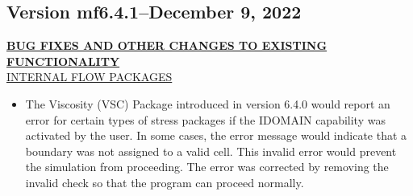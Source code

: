 	\subsection{Version mf6.4.1--December 9, 2022}
	
	\textbf{\underline{BUG FIXES AND OTHER CHANGES TO EXISTING FUNCTIONALITY}} \\

	\underline{INTERNAL FLOW PACKAGES}
	\begin{itemize}
		\item The Viscosity (VSC) Package introduced in version 6.4.0 would report an error for certain types of stress packages if the IDOMAIN capability was activated by the user.  In some cases, the error message would indicate that a boundary was not assigned to a valid cell.  This invalid error would prevent the simulation from proceeding.  The error was corrected by removing the invalid check so that the program can proceed normally.
	\end{itemize}
